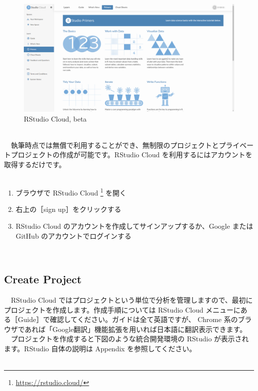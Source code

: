 \documentclass[
  12pt,
]{book}
\DeclareRobustCommand{\href}[2]{#2\footnote{\url{#1}}}
\providecommand{\tightlist}{%
  \setlength{\itemsep}{0pt}\setlength{\parskip}{0pt}}
\begin{document}
\begin{figure}[H]

{\centering \includegraphics[width=0.8\linewidth,]{fig/RStudio/RSCloud_00} 

}

\caption{RStudio Cloud, beta}\label{fig:unnamed-chunk-128}
\end{figure}

　\\
　執筆時点では無償で利用することができ、無制限のプロジェクトとプライベートプロジェクトの作成が可能です。RStudio Cloud を利用するにはアカウントを取得するだけです。\\
　

\begin{enumerate}
\def\labelenumi{\arabic{enumi}.}
\tightlist
\item
  ブラウザで \href{https://rstudio.cloud/}{RStudio Cloud } を開く
\item
  右上の［sign up］をクリックする
\item
  RStudio Cloud のアカウントを作成してサインアップするか、Google または GitHub のアカウントでログインする
\end{enumerate}

　

\hypertarget{create-project}{%
\subsection{Create Project}\label{create-project}}

　RStudio Cloud ではプロジェクトという単位で分析を管理しますので、最初にプロジェクトを作成します。作成手順については RStudio Cloud メニューにある［Guide］で確認してください。ガイドは全て英語ですが、 Chrome 系のブラウザであれば「Google翻訳」機能拡張を用いれば日本語に翻訳表示できます。\\
　プロジェクトを作成すると下図のような統合開発環境の RStudio が表示されます。RStudio 自体の説明は Appendix を参照してください。\\
　\\
\end{document}
